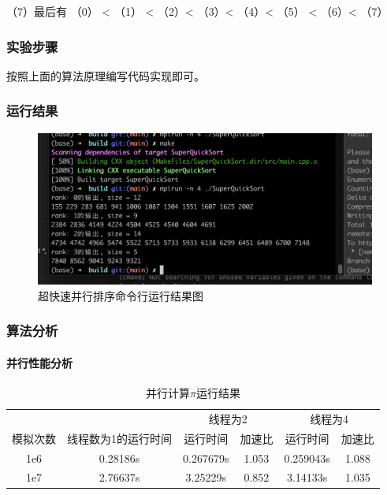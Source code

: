 \documentclass[10pt]{article}
\begin{document}
（7）最后有 （0） < （1） < （2）< （3）< （4）< （5） < （6）< （7）


\subsubsection{实验步骤}

按照上面的算法原理编写代码实现即可。


\subsubsection{运行结果}

\begin{figure}[htbp]
    \centering
    \includegraphics[width=.8\textwidth]{assets/SuperQuickSort.png}
    \caption{超快速并行排序命令行运行结果图}
    \label{超快速并行排序}
\end{figure}


\subsubsection{算法分析}

\paragraph{并行性能分析}

\begin{table}[htbp]
    \centering
    \caption{并行计算$\pi$运行结果}
        \begin{tabular}{|c|c|c|c|c|c|}
        \hline
          &  & \multicolumn{2}{|c|}{线程为2} & \multicolumn{2}{|c|}{线程为4} \\ \cline{3-6}
        模拟次数 & 线程数为1的运行时间 & 运行时间 & 加速比 & 运行时间 & 加速比 \\
        \hline
        1e6 & 0.28186s & 0.267679s & 1.053 & 0.259043s & 1.088 \\
        \hline
        1e7 & 2.76637s & 3.25229s & 0.852 & 3.14133s & 1.035 \\
        \hline
        \end{tabular}
    \label{pi_table}
\end{table}
\end{document}
